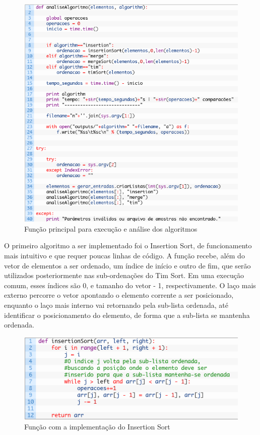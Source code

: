 \begin{figure}[!htb]
\centering
\includegraphics[width=12cm]{img/codigo1-2.png}
\caption{Função principal para execução e análise dos algoritmos}
\label{fig:codigo1-2}
\end{figure}


O primeiro algoritmo a ser implementado foi o Insertion Sort, de funcionamento mais intuitivo e que requer poucas linhas de código. A função recebe, além do vetor de elementos a ser ordenado, um índice de início e outro de fim, que serão utilizados posteriormente nas sub-ordenações do Tim Sort. Em uma execução comum, esses índices são 0, e tamanho do vetor - 1, respectivamente. O laço mais externo percorre o vetor apontando o elemento corrente a ser posicionado, enquanto o laço mais interno vai retornando pela sub-lista ordenada, até identificar o posicionamento do elemento, de forma que a sub-lista se mantenha ordenada.

\begin{figure}[!htb]
\centering
\includegraphics[width=12cm]{img/codigo2.png}
\caption{Função com a implementação do Insertion Sort}
\label{fig:codigo2}
\end{figure}


